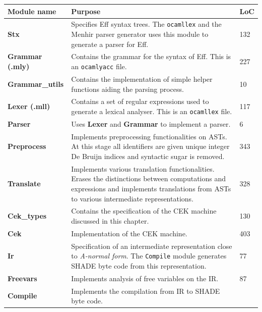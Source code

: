 \documentclass[class=article, crop=false]{standalone}
\begin{document}
\begin{table}[htb]
    \footnotesize
    \centering
    {\renewcommand{\arraystretch}{1.3}
    \begin{tabular}{lp{10cm}l}
    \toprule
    \textbf{Module name} & \textbf{Purpose} & \textbf{LoC} \\
    \midrule
    \textbf{Stx} & 
        Specifies Eff syntax trees. The \verb|ocamllex| and the Menhir parser
        generator uses this module to generate a parser for Eff. &
        132 \\
    \textbf{Grammar (.mly)} &
        Contains the grammar for the syntax of Eff. This is an \verb|ocamlyacc| file. &
        227 \\
    \textbf{Grammar\_utils} &
        Contains the implementation of simple helper functions aiding the parsing process. &
        10 \\
    \textbf{Lexer (.mll)} &
        Contains a set of regular expressions used to generate a lexical analyser.
        This is an \verb|ocamllex| file. &
        117 \\
    \textbf{Parser} &
        Uses \textbf{Lexer} and \textbf{Grammar} to implement a parser. &
        6 \\
    \textbf{Preprocess} &
        Implements preprocessing functionalities on ASTs. At this stage all
        identifiers are given unique integer De Bruijn indices and syntactic sugar is removed.  &
        343 \\
    \textbf{Translate} &
        Implements various translation functionalities. Erases the distinctions
        between computations and expressions and implements translations from
        ASTs to various intermediate representations. &
        328 \\
    \textbf{Cek\_types} & Contains the specification of the CEK machine
        discussed in this chapter. &
        130 \\
    \textbf{Cek} &
        Implementation of the CEK machine. &
        403 \\
    \textbf{Ir} &
        Specification of an intermediate representation close to \emph{A-normal
        form}. The \verb|Compile| module generates SHADE byte code from this
        representation. &
        77 \\
    \textbf{Freevars} &
        Implements analysis of free variables on the IR. &
        87 \\
    \textbf{Compile} &
        Implements the compilation from IR to SHADE byte code. &

\end{tabular}}
\end{table}
\end{document}

